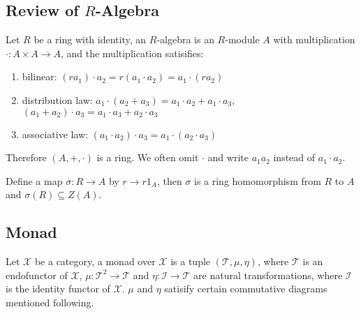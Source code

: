 \documentclass{article}
\begin{document}
\subsection{Review of $R$-Algebra}
Let $R$ be a ring with identity, an $R$-algebra is an $R$-module $A$ with
multiplication $\cdot : A \times A \to A$, and the multiplication
satisifies:
\begin{enumerate}
\item bilinear: $(r a_1) \cdot a_2 = r (a_1 \cdot a_2) = a_1 \cdot (r a_2)$
\item distribution law: $a_1 \cdot (a_2 + a_3) = a_1 \cdot a_2 + a_1 \cdot a_3$,
  $(a_1 + a_2) \cdot a_3 = a_1 \cdot a_3 + a_2 \cdot a_3$
\item associative law: $(a_1 \cdot a_2) \cdot a_3 = a_1 \cdot (a_2 \cdot a_3)$
\end{enumerate}
Therefore $(A, +, \cdot)$ is a ring.
We often omit $\cdot$ and write $a_1a_2$ instead of $a_1 \cdot a_2$.

Define a map $\sigma: R \to A$ by $r \to r 1_A$,
then $\sigma$ is a ring homomorphism from $R$ to $A$ and
$\sigma(R) \subseteq Z(A)$.

\subsection{Monad}
Let $\mathcal X$ be a category, a monad over $\mathcal X$ is a tuple $(\mathcal T, \mu, \eta)$,
where $\mathcal T$ is an endofunctor of $\mathcal X$, $\mu : \mathcal T^2 \to \mathcal T$
and $\eta : \mathcal I \to \mathcal T$ are natural transformations,
where $\mathcal I$ is the identity functor of $\mathcal X$.
$\mu$ and $\eta$ satisify certain commutative diagrams mentioned following.
\end{document}
